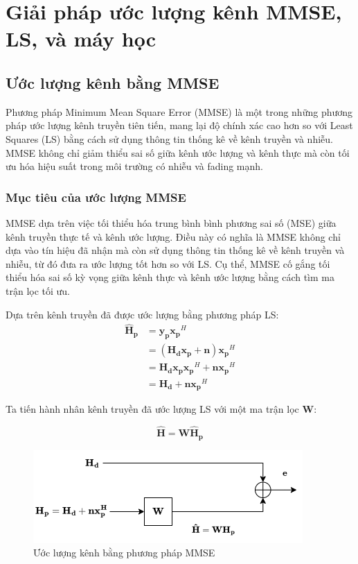 \section{Giải pháp ước lượng kênh MMSE, LS, và máy học}

\subsection{Ước lượng kênh bằng MMSE}

Phương pháp Minimum Mean Square Error (MMSE) là một trong những phương pháp ước lượng kênh truyền tiên tiến, mang lại độ chính xác cao hơn so với Least Squares (LS) bằng cách sử dụng thông tin thống kê về kênh truyền và nhiễu. 
MMSE không chỉ giảm thiểu sai số giữa kênh ước lượng và kênh thực mà còn tối ưu hóa hiệu suất trong môi trường có nhiễu và fading mạnh. 

\subsubsection{Mục tiêu của ước lượng MMSE}

MMSE dựa trên việc tối thiểu hóa trung bình bình phương sai số (MSE) giữa kênh truyền thực tế và kênh ước lượng. 
Điều này có nghĩa là MMSE không chỉ dựa vào tín hiệu đã nhận mà còn sử dụng thông tin thống kê về kênh truyền và nhiễu, 
từ đó đưa ra ước lượng tốt hơn so với LS. 
Cụ thể, MMSE cố gắng tối thiểu hóa sai số kỳ vọng giữa kênh thực và kênh ước lượng bằng cách tìm ma trận lọc tối ưu.

Dựa trên kênh truyền đã được ước lượng bằng phương pháp LS:
% 
\begin{align*}
    \bm{\hat{H}_p} 
    &= \bm{y_p}\bm{x_p}^H \\
    &= (\bm{H_d}\bm{x_p} + \bm{n})\bm{x_p}^H \\
    &= \bm{H_d}\bm{x_p}\bm{x_p}^H + \bm{n}\bm{x_p}^H \\
    &= \bm{H_d} + \bm{n}\bm{x_p}^H
\end{align*}

Ta tiến hành nhân kênh truyền đã ước lượng LS với một ma trận lọc \( \bm{W} \):

\[
    \bm{\hat{H}} = \bm{W}\bm{\hat{H}_p} 
\]

\begin{figure}[H]
    \centering
    \includegraphics[width=.75\textwidth]{../images/mmse_block_diagram.png}
    \caption{Ước lượng kênh bằng phương pháp MMSE}
\end{figure}

